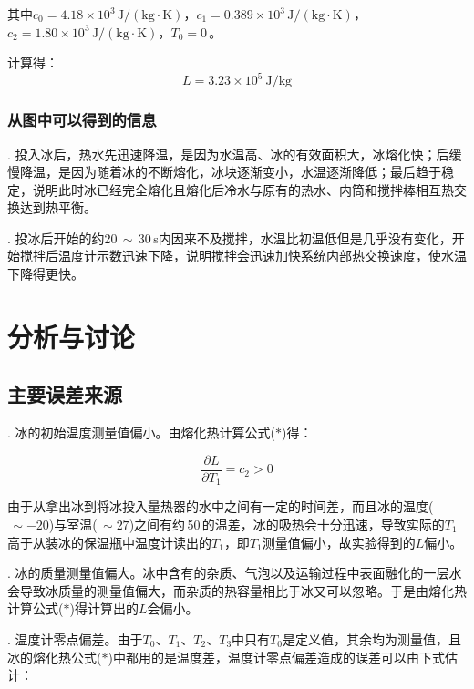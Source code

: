 \documentclass{ctexart}
\begin{document}
其中$c_0 = 4.18\times10^3\,\mathrm{J/(kg\cdot K)}$，$c_1 = 0.389\times10^3\,\mathrm{J/(kg\cdot K)}$，$c_2 = 1.80\times10^3\,\mathrm{J/(kg\cdot K)}$，$T_0 = 0$\,\textcelsius。

计算得：
\[
    L = 3.23\times10^5\ \mathrm{J/kg}
\]

\subsubsection*{从图中可以得到的信息}

. 投入冰后，热水先迅速降温，是因为水温高、冰的有效面积大，冰熔化快；后缓慢降温，是因为随着冰的不断熔化，冰块逐渐变小，水温逐渐降低；最后趋于稳定，说明此时冰已经完全熔化且熔化后冷水与原有的热水、内筒和搅拌棒相互热交换达到热平衡。

\medskip

. 投冰后开始的约20$\,\sim\,$30\,s内因来不及搅拌，水温比初温低但是几乎没有变化，开始搅拌后温度计示数迅速下降，说明搅拌会迅速加快系统内部热交换速度，使水温下降得更快。

\section{分析与讨论}

\subsection*{主要误差来源}

. 冰的初始温度测量值偏小。由熔化热计算公式($*$)得：

\[\frac{\partial L}{\partial T_1} = c_2 > 0\]

由于从拿出冰到将冰投入量热器的水中之间有一定的时间差，而且冰的温度($\,\sim -20$\textcelsius)与室温($\,\sim 27$\textcelsius)之间有约\,50\textcelsius\,的温差，冰的吸热会十分迅速，导致实际的$T_1$高于从装冰的保温瓶中温度计读出的$T_1$，即$T_1$测量值偏小，故实验得到的$L$偏小。

\medskip

. 冰的质量测量值偏大。冰中含有的杂质、气泡以及运输过程中表面融化的一层水会导致冰质量的测量值偏大，而杂质的热容量相比于冰又可以忽略。于是由熔化热计算公式($*$)得计算出的$L$会偏小。

\medskip

. 温度计零点偏差。由于$T_0$、$T_1$、$T_2$、$T_3$中只有$T_0$是定义值，其余均为测量值，且冰的熔化热公式($*$)中都用的是温度差，温度计零点偏差造成的误差可以由下式估计：
\end{document}
